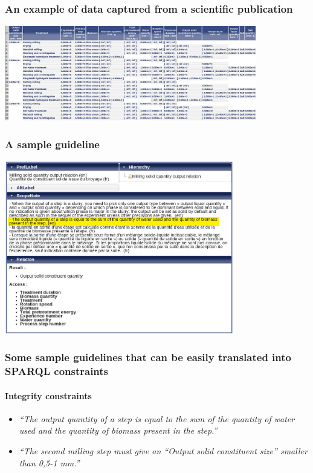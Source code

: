 \documentclass{beamer}
\begin{document}
\begin{frame}
  \frametitle{An example of data captured from a scientific publication}

  \begin{center}
    \includegraphics[width=11cm]{table.jpg}
  \end{center}
\end{frame}

\begin{frame}
  \frametitle{A sample guideline}

  \begin{center}
    \includegraphics[width=10cm]{guideline.jpg}
  \end{center}
\end{frame}

\begin{frame}
  \frametitle{Some sample guidelines that can be easily translated into SPARQL
  constraints}
  \framesubtitle{Integrity constraints}

  \begin{itemize}
    \item \textit{``The output quantity of a step is equal to the sum of the
      quantity of water used and the quantity of biomass present in the
    step.''}

    \pause

    \item \textit{``The second milling step must give an “Output solid
      constituent size” smaller than 0,5-1 mm.''}
  \end{itemize}
\end{frame}
\end{document}
